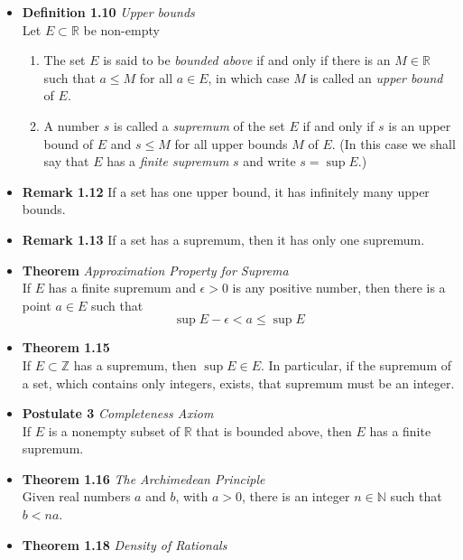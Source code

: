 \documentclass[11pt,a4paper]{article}
\begin{document}
\begin{itemize}
    \item \textbf{Definition 1.10} \emph{Upper bounds} \\
        Let $E \subset \mathbb{R}$ be non-empty
        \begin{enumerate}
            \item The set $E$ is said to be \emph{bounded above} if and only if there is an
                $M \in \mathbb{R}$ such that $a \leq M$ for all $a \in E$,
                in which case $M$ is called an \emph{upper bound} of $E$.
            \item A number $s$ is called a \emph{supremum} of the set $E$ if and only if $s$
                is an upper bound of $E$ and $s \leq M$ for all upper bounds $M$ of $E$.
                (In this case we shall say that $E$ has a \emph{finite supremum} $s$ and write
                $s = \sup E$.)
        \end{enumerate}
    \item \textbf{Remark 1.12}
        If a set has one upper bound, it has infinitely many upper bounds.
    \item \textbf{Remark 1.13}
        If a set has a supremum, then it has only one supremum.
    \item \textbf{Theorem} \emph{Approximation Property for Suprema} \\
        If $E$ has a finite supremum and $\epsilon > 0$ is any positive number, then there is a
        point $a \in E$ such that
        \[
            \sup E - \epsilon < a \leq \sup E
        \]
    \item \textbf{Theorem 1.15} \\
        If $E \subset \mathbb{Z}$ has a supremum, then $\sup E \in E$.
        In particular, if the supremum of a set, which contains only integers, exists,
        that supremum must be an integer.
    \item \textbf{Postulate 3} \emph{Completeness Axiom} \\
        If $E$ is a nonempty subset of $\mathbb{R}$ that is bounded above, then $E$ has a
        finite
        supremum.
    \item \textbf{Theorem 1.16} \emph{The Archimedean Principle} \\
        Given real numbers $a$ and $b$, with $a > 0$, there is an integer $n \in \mathbb{N}$
        such that $b < na$.
    \item \textbf{Theorem 1.18} \emph{Density of Rationals} \\

\end{itemize}
\end{document}
